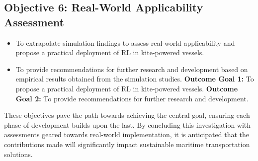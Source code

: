 \subsection*{Objective 6: Real-World Applicability Assessment}
\begin{itemize}
    \item To extrapolate simulation findings to assess real-world applicability and propose a  practical deployment of RL in kite-powered vessels.
    \item To provide recommendations for further research and development based on empirical results obtained from the simulation studies.
    \newline\textbf{Outcome Goal 1:} To propose a practical deployment of RL in kite-powered vessels.
    \newline\textbf{Outcome Goal 2:} To provide recommendations for further research and development.
\end{itemize}

These objectives pave the path towards achieving the central goal, ensuring each phase of development builds upon the last. By concluding this investigation with assessments geared towards real-world implementation, it is anticipated that the contributions made will significantly impact sustainable maritime transportation solutions.



